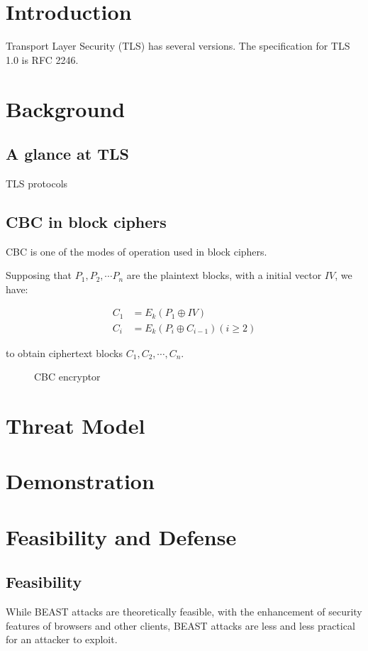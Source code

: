 \documentclass{acm_proc_article-sp}
\begin{document}
\section{Introduction}
Transport Layer Security (TLS) has several versions. The specification for TLS
1.0 is RFC 2246\cite{rfc2246}.

\section{Background}
\subsection{A glance at TLS}

TLS protocols

\subsection{CBC in block ciphers}
CBC is one of the modes of operation used in block ciphers.

Supposing that $P_1,P_2,\cdots P_n$ are the plaintext blocks, with a initial vector $IV$, we have:

$$
\begin{aligned}
C_1&=E_k(P_1\oplus IV)\\
C_i&=E_k(P_{i}\oplus C_{i-1}) (i\geq 2)
\end{aligned}
$$

to obtain ciphertext blocks $C_1,C_2,\cdots,C_n$.

\begin{figure}[htb]
  \centering
  
  \caption{CBC encryptor}
\end{figure}
\section{Threat Model}

\section{Demonstration}
\section{Feasibility and Defense}
\subsection{Feasibility}
While BEAST attacks are theoretically feasible, with the enhancement of security
features of browsers and other clients, BEAST attacks are less and less practical
for an attacker to exploit.
\end{document}
